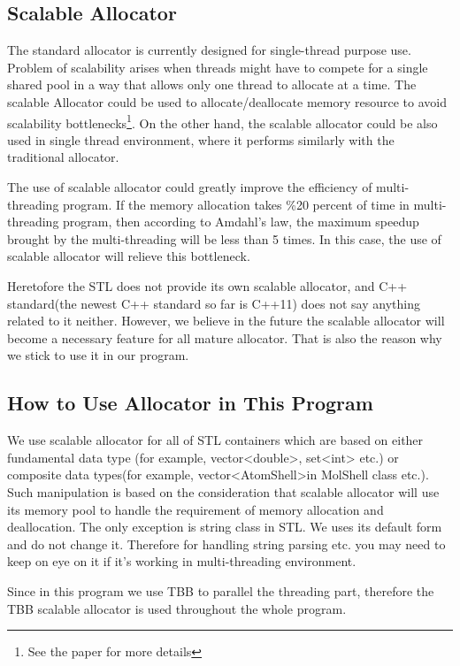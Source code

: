 \subsection{Scalable Allocator}
%
%
%
The standard allocator is currently designed for single-thread purpose use. Problem of 
scalability arises when threads might have to compete for a single shared pool in a way 
that allows only one thread to allocate at a time. The scalable Allocator could be used
to allocate/deallocate memory resource to avoid scalability bottlenecks\footnote{
See the paper\cite{berger2000hoard,michael2004scalable,hudson2006mcrt} for more details}.
On the other hand, the scalable allocator could be also used in single thread environment,
where it performs similarly with the traditional allocator.

The use of scalable allocator could greatly improve the efficiency of multi-threading
program. If the memory allocation takes \%20 percent of time in multi-threading program,
then according to Amdahl's law, the maximum speedup brought by the multi-threading
will be less than 5 times. In this case, the use of scalable allocator will relieve 
this bottleneck.

Heretofore the STL does not provide its own scalable allocator, and C++ standard(the newest
C++ standard so far is C++11) does not say anything related to it neither. However, we believe
in the future the scalable allocator will become a necessary feature for all mature allocator.
That is also the reason why we stick to use it in our program.

\subsection{How to Use Allocator in This Program}

We use scalable allocator for all of STL containers which are based on either fundamental 
data type (for example, vector<double>, set<int> etc.) or composite data types(for example, 
vector<AtomShell>in MolShell class etc.). Such manipulation is based on the consideration
that scalable allocator will use its memory pool to handle the requirement of memory
allocation and deallocation. The only exception is string class in STL. We uses its default
form and do not change it. Therefore for handling string parsing etc. you may need to 
keep on eye on it if it's working in multi-threading environment.

Since in this program we use TBB to parallel the threading part, therefore the TBB scalable
allocator is used throughout the whole program.


